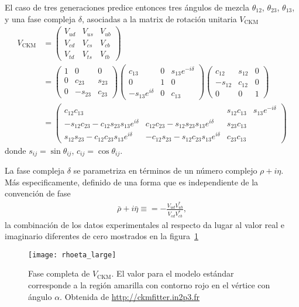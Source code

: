 \begin{frame}
El caso de tres generaciones predice entonces tres ángulos de mezcla $\theta_{12}$, $\theta_{23}$, $\theta_{13}$, y una fase compleja $\delta$, asociadas a la matrix de rotación unitaria $V_{\text{CKM}}$
\begin{align}
\label{eq:vckm}
  V_{\text{CKM}} &=\left(\begin{array}{ccc}{V_{u d}} & {V_{u s}} & {V_{u b}} \\ {V_{c d}} & {V_{c s}} & {V_{c b}} \\ {V_{t d}} & {V_{t s}} & {V_{t b}}\end{array}\right) \nonumber\\
                   &=\left(\begin{array}{ccc}{1} & {0} & {0} \\ {0} & {c_{23}} & {s_{23}} \\ {0} & {-s_{23}} & {c_{23}}\end{array}\right)\left(\begin{array}{ccc}{c_{13}} & {0} & {s_{13} e^{-i \delta}} \\ {0} & {1} & {0} \\ {-s_{13} e^{i \delta}} & {0} & {c_{13}}\end{array}\right)\left(\begin{array}{ccc}{c_{12}} & {s_{12}} & {0} \\ {-s_{12}} & {c_{12}} & {0} \\ {0} & {0} & {1}\end{array}\right) \\ &=\left(\begin{array}{cccccc}{c_{12} c_{13}} & {} & {s_{12} c_{13}} & {s_{13} e^{-i \delta}} \\ {-s_{12} c_{23}-c_{12} s_{23} s_{13} e^{i \delta}} & {c_{12} c_{23}-s_{12} s_{23} s_{13} e^{i \delta}} & {s_{23} c_{13}} \\ {s_{12} s_{23}-c_{12} c_{23} s_{13} e^{i \delta}} & {-c_{12} s_{23}-s_{12} c_{23} s_{13} e^{i \delta}} & {c_{23} c_{13}}\end{array}\right) 
\end{align}
donde $s_{i j}=\sin \theta_{i j}$, $c_{i j}=\cos \theta_{i j}$.

La fase compleja $\delta$ se parametriza en términos de un número complejo $\rho+i\eta$. Más especificamente, definido de una forma que es independiente de la convención de fase
\begin{align}
  \bar{\rho}+i\bar{\eta}\equiv =-\frac{V_{u d} V_{u b}^{*}}{V_{c d} V_{c b}^{*}},
\end{align}
la combinación de los datos experimentales al respecto da lugar al valor real e imaginario diferentes de cero mostrados en la figura~\ref{fig:vckmdelta}
\begin{figure}
  \centering
  \texttt{[image: rhoeta\_large]}
  \caption{Fase completa de $V_{\text{CKM}}$. El valor para el modelo estándar corresponde a la región amarilla con contorno rojo en el vértice con ángulo $\alpha$. Obtenida de \url{http://ckmfitter.in2p3.fr} }
  \label{fig:vckmdelta}
\end{figure}
\end{frame}
